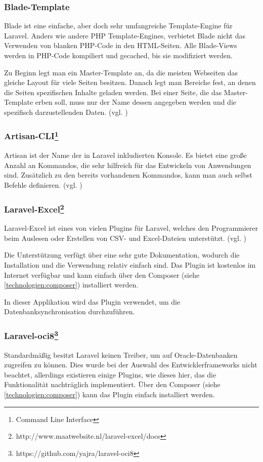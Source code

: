 \subsubsection{Blade-Template}
Blade ist eine einfache, aber doch sehr umfangreiche Template-Engine für Laravel. Anders wie andere PHP Template-Engines, verbietet Blade nicht das Verwenden von blanken PHP-Code in den HTML-Seiten. Alle Blade-Views werden in PHP-Code kompiliert und gecached, bis sie modifiziert werden.

Zu Beginn legt man ein Master-Template an, da die meisten Webseiten das gleiche Layout für viele Seiten besitzen. Danach legt man Bereiche fest, an denen die Seiten spezifischen Inhalte geladen werden. Bei einer Seite, die das Master-Template erben soll, muss nur der Name dessen angegeben werden und die spezifisch darzustellenden Daten. (vgl. \cite{blade})

\subsubsection[Artisan-CLI]{Artisan-CLI\footnote{Command Line Interface}}
Artisan ist der Name der in Laravel inkludierten Konsole. Es bietet eine große Anzahl an Kommandos, die sehr hilfreich für das Entwickeln von Anwendungen sind. Zusätzlich zu den bereits vorhandenen Kommandos, kann man auch selbst Befehle definieren. (vgl. \cite{artisan})

\subsubsection[Laravel-Excel]{Laravel-Excel\footnote{http://www.maatwebsite.nl/laravel-excel/docs}}
Laravel-Excel ist eines von vielen Plugins für Laravel, welches den Programmierer beim Auslesen oder Erstellen von CSV- und Excel-Dateien unterstützt. (vgl. \cite{laravelExcel})

Die Unterstützung verfügt über eine sehr gute Dokumentation, wodurch die Installation und die Verwendung relativ einfach sind. Das Plugin ist kostenlos im Internet verfügbar und kann einfach über den Composer (siehe \ref{technologien:composer}) installiert werden.

In dieser Applikation wird das Plugin verwendet, um die Datenbanksynchronisation durchzuführen.

\subsubsection[Laravel-oci8]{Laravel-oci8\footnote{https://github.com/yajra/laravel-oci8}}
Standardmäßig besitzt Laravel keinen Treiber, um auf Oracle-Datenbanken zugreifen zu können. Dies wurde bei der Auswahl des Entwicklerframeworks nicht beachtet, allerdings existieren einige Plugins, wie dieses hier, das die Funktionalität nachträglich implementiert. Über den Composer (siehe \ref{technologien:composer}) kann das Plugin einfach installiert werden. 

